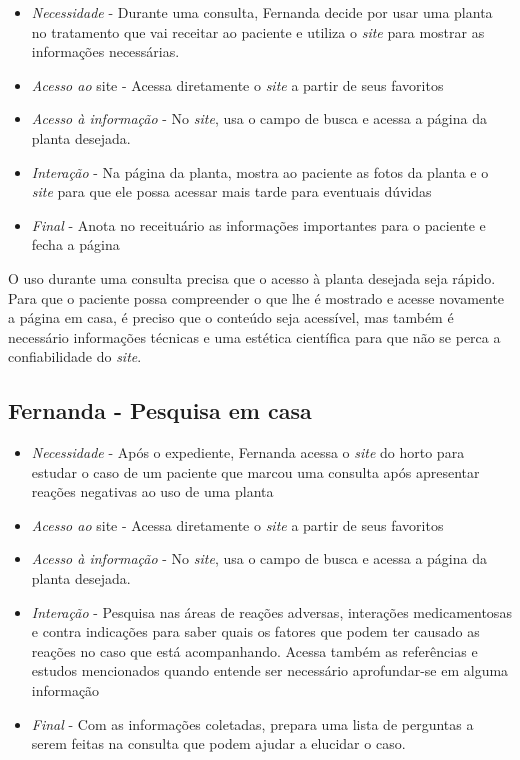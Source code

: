 \begin{itemize}
\item
  \emph{Necessidade} - Durante uma consulta, Fernanda decide por usar uma planta no tratamento que vai receitar ao paciente e utiliza o \emph{site} para mostrar as informações necessárias.
\item
  \emph{Acesso ao} site - Acessa diretamente o \emph{site} a partir de seus favoritos
\item
  \emph{Acesso à informação} - No \emph{site}, usa o campo de busca e acessa a página da planta desejada.
\item
  \emph{Interação} - Na página da planta, mostra ao paciente as fotos da planta e o \emph{site} para que ele possa acessar mais tarde para eventuais dúvidas
\item
  \emph{Final} - Anota no receituário as informações importantes para o paciente e fecha a página
\end{itemize}

O uso durante uma consulta precisa que o acesso à planta desejada seja rápido. Para que o paciente possa compreender o que lhe é mostrado e acesse novamente a página em casa, é preciso que o conteúdo seja acessível, mas também é necessário informações técnicas e uma estética científica para que não se perca a confiabilidade do \emph{site}.

\subsection{Fernanda - Pesquisa em casa}\label{fernanda---pesquisa-em-casa}

\begin{itemize}
\item
  \emph{Necessidade} - Após o expediente, Fernanda acessa o \emph{site} do horto para estudar o caso de um paciente que marcou uma consulta após apresentar reações negativas ao uso de uma planta
\item
  \emph{Acesso ao} site - Acessa diretamente o \emph{site} a partir de seus favoritos
\item
  \emph{Acesso à informação} - No \emph{site}, usa o campo de busca e acessa a página da planta desejada.
\item
  \emph{Interação} - Pesquisa nas áreas de reações adversas, interações medicamentosas e contra indicações para saber quais os fatores que podem ter causado as reações no caso que está acompanhando. Acessa também as referências e estudos mencionados quando entende ser necessário aprofundar-se em alguma informação
\item
  \emph{Final} - Com as informações coletadas, prepara uma lista de perguntas a serem feitas na consulta que podem ajudar a elucidar o caso.
\end{itemize}

